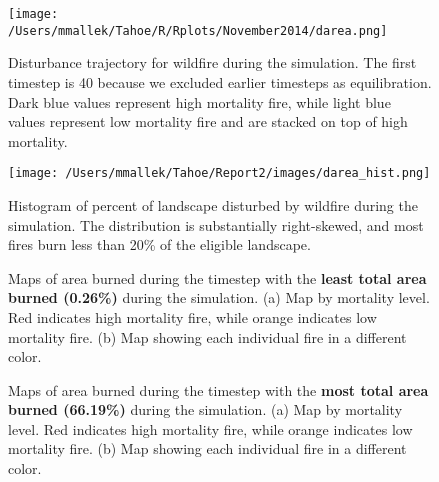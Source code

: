 \begin{figure}[!htbp]
\centering
\texttt{[image: /Users/mmallek/Tahoe/R/Rplots/November2014/darea.png]}
\caption{Disturbance trajectory for wildfire during the simulation. The first timestep is 40 because we excluded earlier timesteps as equilibration. Dark blue values represent high mortality fire, while light blue values represent low mortality fire and are stacked on top of high mortality.}
\label{fig:darea}
\end{figure}

\begin{figure}[!htbp]
\centering
\texttt{[image: /Users/mmallek/Tahoe/Report2/images/darea\_hist.png]}
\caption{Histogram of percent of landscape disturbed by wildfire during the simulation. The distribution is substantially right-skewed, and most fires burn less than 20\% of the eligible landscape.}
\label{fig:darea_hist}
\end{figure}


\begin{figure}[!htbp]
  \centering
  \caption{Maps of area burned during the timestep with the \textbf{least total area burned (0.26\%)} during the simulation. (a) Map by mortality level. Red indicates high mortality fire, while orange indicates low mortality fire. (b) Map showing each individual fire in a different color.}
  \label{fig:darea_min_map}
\end{figure}

\begin{figure}[!htbp]
  \centering
  \caption{Maps of area burned during the timestep with the \textbf{most total area burned (66.19\%)} during the simulation. (a) Map by mortality level. Red indicates high mortality fire, while orange indicates low mortality fire. (b) Map showing each individual fire in a different color.}
  \label{fig:darea_max_map}
\end{figure}

